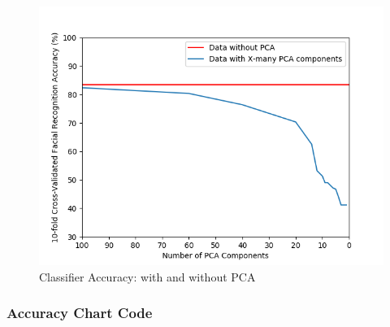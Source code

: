 \documentclass[11pt]{article}
\begin{document}
\begin{figure}[h!]
	\centering
	\includegraphics{../figures/q3/pca-accuracy.png}
	\caption{Classifier Accuracy: with and without PCA}
\end{figure}

\pagebreak

\subsubsection{Accuracy Chart Code}
\end{document}
